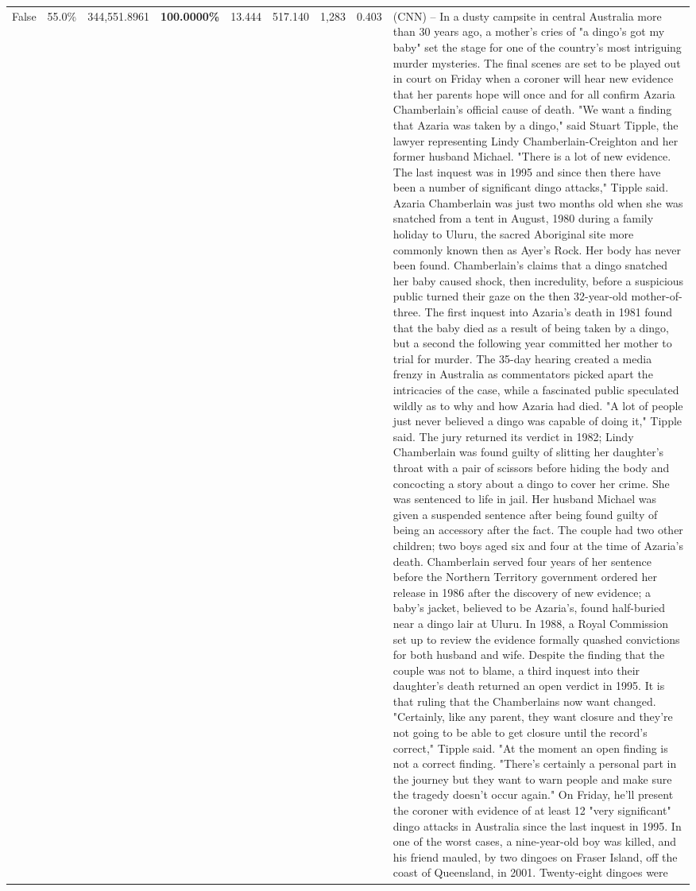 \begin{table}[H]
\begin{tabular}{lllrlllll}
False & 55.0\% & 344,551.8961 & \bfseries \color{red} 100.0000\% & 13.444 & 517.140 & 1,283 & 0.403 & (CNN) -- In a dusty campsite in central Australia more than 30 years ago, a mother's cries of "a dingo's got my baby" set the stage for one of the country's most intriguing murder mysteries. The final scenes are set to be played out in court on Friday when a coroner will hear new evidence that her parents hope will once and for all confirm Azaria Chamberlain's official cause of death. "We want a finding that Azaria was taken by a dingo," said Stuart Tipple, the lawyer representing Lindy Chamberlain-Creighton and her former husband Michael. "There is a lot of new evidence. The last inquest was in 1995 and since then there have been a number of significant dingo attacks," Tipple said. Azaria Chamberlain was just two months old when she was snatched from a tent in August, 1980 during a family holiday to Uluru, the sacred Aboriginal site more commonly known then as Ayer's Rock. Her body has never been found. Chamberlain's claims that a dingo snatched her baby caused shock, then incredulity, before a suspicious public turned their gaze on the then 32-year-old mother-of-three. The first inquest into Azaria's death in 1981 found that the baby died as a result of being taken by a dingo, but a second the following year committed her mother to trial for murder. The 35-day hearing created a media frenzy in Australia as commentators picked apart the intricacies of the case, while a fascinated public speculated wildly as to why and how Azaria had died. "A lot of people just never believed a dingo was capable of doing it," Tipple said. The jury returned its verdict in 1982; Lindy Chamberlain was found guilty of slitting her daughter's throat with a pair of scissors before hiding the body and concocting a story about a dingo to cover her crime. She was sentenced to life in jail. Her husband Michael was given a suspended sentence after being found guilty of being an accessory after the fact. The couple had two other children; two boys aged six and four at the time of Azaria's death. Chamberlain served four years of her sentence before the Northern Territory government ordered her release in 1986 after the discovery of new evidence; a baby's jacket, believed to be Azaria's, found half-buried near a dingo lair at Uluru. In 1988, a Royal Commission set up to review the evidence formally quashed convictions for both husband and wife. Despite the finding that the couple was not to blame, a third inquest into their daughter's death returned an open verdict in 1995. It is that ruling that the Chamberlains now want changed. "Certainly, like any parent, they want closure and they're not going to be able to get closure until the record's correct," Tipple said. "At the moment an open finding is not a correct finding. "There's certainly a personal part in the journey but they want to warn people and make sure the tragedy doesn't occur again." On Friday, he'll present the coroner with evidence of at least 12 "very significant" dingo attacks in Australia since the last inquest in 1995. In one of the worst cases, a nine-year-old boy was killed, and his friend mauled, by two dingoes on Fraser Island, off the coast of Queensland, in 2001. Twenty-eight dingoes were 
\end{tabular}
\end{table}

